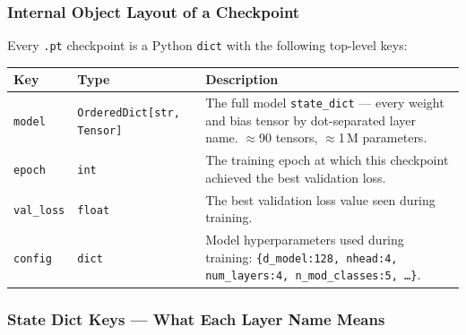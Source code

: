 \documentclass[11pt,a4paper]{article}
\begin{document}
\subsubsection{Internal Object Layout of a Checkpoint}

Every \texttt{.pt} checkpoint is a Python \texttt{dict} with the
following top-level keys:

\begin{center}
\renewcommand{\arraystretch}{1.35}
\begin{tabularx}{\textwidth}{>{\ttfamily}l l X}
\toprule
\textbf{Key} & \textbf{Type} & \textbf{Description} \\
\midrule
\texttt{model}
  & \texttt{OrderedDict[str, Tensor]}
  & The full model \texttt{state\_dict} — every weight and bias tensor by
    dot-separated layer name. $\approx$90 tensors, $\approx$1\,M parameters. \\[4pt]
\texttt{epoch}
  & \texttt{int}
  & The training epoch at which this checkpoint achieved the best
    validation loss. \\[4pt]
\texttt{val\_loss}
  & \texttt{float}
  & The best validation loss value seen during training. \\[4pt]
\texttt{config}
  & \texttt{dict}
  & Model hyperparameters used during training:
    \texttt{\{d\_model:128, nhead:4, num\_layers:4, n\_mod\_classes:5, \ldots\}}. \\
\bottomrule
\end{tabularx}
\end{center}

\subsubsection{State Dict Keys — What Each Layer Name Means}
\end{document}

